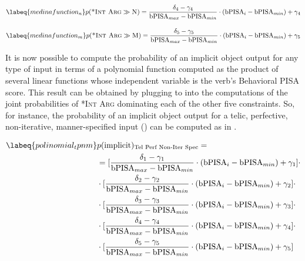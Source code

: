 \begin{equation} \labeq{medinafunction_n}
p(\textsc{*Int Arg} \gg \textsc{N}) = \frac{\delta_4 - \gamma_4}{\textrm{bPISA}_{max} - \textrm{bPISA}_{min}} \cdot ({\textrm{bPISA}_{i} - \textrm{bPISA}_{min}}) + \gamma_4
\end{equation}

\begin{equation} \labeq{medinafunction_m}
p(\textsc{*Int Arg} \gg \textsc{M}) = \frac{\delta_5 - \gamma_5}{\textrm{bPISA}_{max} - \textrm{bPISA}_{min}} \cdot ({\textrm{bPISA}_{i} - \textrm{bPISA}_{min}}) + \gamma_5
\end{equation}

It is now possible to compute the probability of an implicit object output for any type of input in terms of a polynomial function computed as the product of several linear functions whose independent variable is the verb's Behavioral PISA score. This result can be obtained by plugging  to  into the computations of the joint probabilities of \textsc{*Int Arg} dominating each of the other five constraints. So, for instance, the probability of an implicit object output for a telic, perfective, non-iterative, manner-specified input () can be computed as in .

\begin{align}  \labeq{polinomial_tpnm}
    & p(\text{implicit})\textsubscript{Tel Perf Non-Iter Spec} = \nonumber \\ & = [\frac{\delta_1 - \gamma_1}{\textrm{bPISA}_{max} - \textrm{bPISA}_{min}} \cdot ({\textrm{bPISA}_{i} - \textrm{bPISA}_{min}}) + \gamma_1] \cdot \nonumber \\ & \cdot [\frac{\delta_2 - \gamma_2}{\textrm{bPISA}_{max} - \textrm{bPISA}_{min}} \cdot ({\textrm{bPISA}_{i} - \textrm{bPISA}_{min}}) + \gamma_2] \cdot \nonumber \\ & \cdot [\frac{\delta_3 - \gamma_3}{\textrm{bPISA}_{max} - \textrm{bPISA}_{min}} \cdot ({\textrm{bPISA}_{i} - \textrm{bPISA}_{min}}) + \gamma_3] \cdot \nonumber \\ & \cdot [\frac{\delta_4 - \gamma_4}{\textrm{bPISA}_{max} - \textrm{bPISA}_{min}} \cdot ({\textrm{bPISA}_{i} - \textrm{bPISA}_{min}}) + \gamma_4] \cdot \nonumber \\ & \cdot [\frac{\delta_5 - \gamma_5}{\textrm{bPISA}_{max} - \textrm{bPISA}_{min}} \cdot ({\textrm{bPISA}_{i} - \textrm{bPISA}_{min}}) + \gamma_5]
\end{align}

